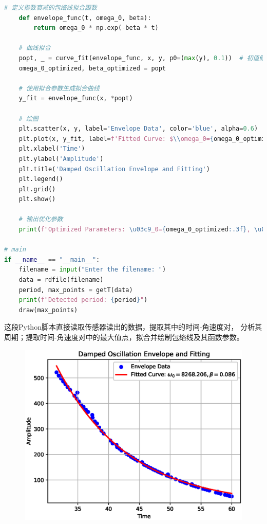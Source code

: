 \documentclass[12pt,hyperref,a4paper,UTF8]{ctexart}
\begin{document}
\begin{lstlisting}[language=Python]
    # 定义指数衰减的包络线拟合函数
    def envelope_func(t, omega_0, beta):
        return omega_0 * np.exp(-beta * t)

    # 曲线拟合
    popt, _ = curve_fit(envelope_func, x, y, p0=(max(y), 0.1))  # 初值假设
    omega_0_optimized, beta_optimized = popt

    # 使用拟合参数生成拟合曲线
    y_fit = envelope_func(x, *popt)

    # 绘图
    plt.scatter(x, y, label='Envelope Data', color='blue', alpha=0.6)
    plt.plot(x, y_fit, label=f'Fitted Curve: $\\omega_0={omega_0_optimized:.3f}, \\beta={beta_optimized:.3f}$', color='red', linewidth=2)
    plt.xlabel('Time')
    plt.ylabel('Amplitude')
    plt.title('Damped Oscillation Envelope and Fitting')
    plt.legend()
    plt.grid()
    plt.show()

    # 输出优化参数
    print(f"Optimized Parameters: \u03c9_0={omega_0_optimized:.3f}, \u03b2={beta_optimized:.3f}")

# main
if __name__ == "__main__":
    filename = input("Enter the filename: ")
    data = rdfile(filename)
    period, max_points = getT(data)
    print(f"Detected period: {period}")
    draw(max_points)    
\end{lstlisting}

这段Python脚本直接读取传感器读出的数据，提取其中的时间-角速度对，
分析其周期；提取时间-角速度对中的最大值点，拟合并绘制包络线及其函数参数。

\begin{figure}[htbp]
    \centering
    \includegraphics{Figure_1.eps}
    \caption{}
\end{figure}
\end{document}
